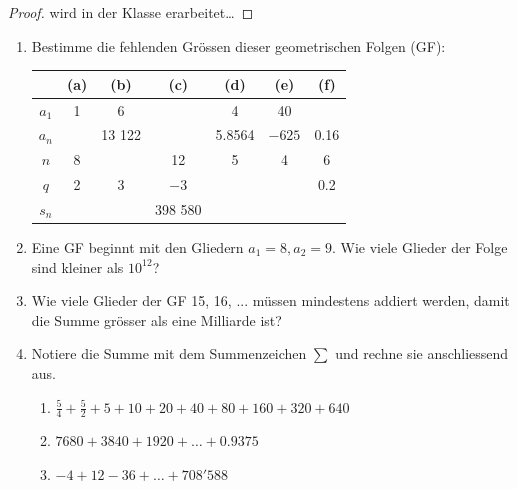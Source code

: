 \begin{proof}
    wird in der Klasse erarbeitet\dots
    \vfill
\end{proof}

\clearpage
\begin{ueb}
    {}{}
    \begin{enumerate}
        
        \item Bestimme die fehlenden Grössen dieser geometrischen Folgen (GF):

        \begin{center}
        \begin{tabular}{|c|c|c|c|c|c|c|}
        \hline
         & (a) & (b) & (c) & (d) & (e) & (f) \\
        \hline
        $a_1$ & 1 & 6 &  & 4 & 40 &  \\
        \hline
        $a_n$ &  & 13 122 & & 5.8564  & $-625$ & 0.16 \\
        \hline
        $n$ & 8 &  & 12 & 5 & 4 & 6 \\
        \hline
        $q$ & 2 & 3 & $-3$ &  &  & 0.2 \\
        \hline
        $s_n$ &  &  & 398 580 &  &  &  \\
        \hline
        \end{tabular}
        \end{center}

        \item Eine GF beginnt mit den Gliedern $a_1 = 8, a_2 =9$. Wie viele Glieder der Folge sind kleiner als $10^{12}$? 
        \item Wie viele Glieder der GF 15, 16, ... müssen mindestens addiert werden, damit die Summe grösser als eine Milliarde ist?
        \item Notiere die Summe mit dem Summenzeichen $\sum$ und rechne sie anschliessend aus.
        \begin{enumerate}
            \item $\frac{5}{4} + \frac{5}{2} + 5 + 10 + 20 + 40 + 80 + 160 + 320 + 640$
            \item $7680 + 3840 + 1920 + \dots + 0.9375$
            \item $-4 + 12 - 36 + \dots + 708'588$
        \end{enumerate}
        

\end{enumerate}
\end{ueb}

